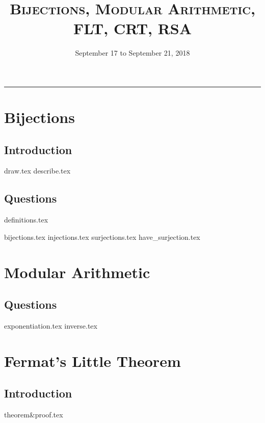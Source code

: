 \documentclass{exam}
\title{\textsc{Bijections, Modular Arithmetic, FLT, CRT, RSA}}
\date{September 17 to September 21, 2018}
\begin{document}
\maketitle
\rule{\textwidth}{0.15em}
\fontsize{12}{15}\selectfont
\thispagestyle{empty}

\section{Bijections}
\subsection{Introduction}
\begin{questions}
{draw.tex}
{describe.tex}
\end{questions}
\subsection{Questions}
{definitions.tex}
\begin{questions}
{bijections.tex}
{injections.tex}
{surjections.tex}
{have_surjection.tex}
\end{questions}

\section{Modular Arithmetic}
\subsection{Questions}
\begin{questions}
{exponentiation.tex}
{inverse.tex}
\end{questions}

\section{Fermat's Little Theorem}
\subsection{Introduction}
{theorem&proof.tex} 
\newpage
\end{document}
